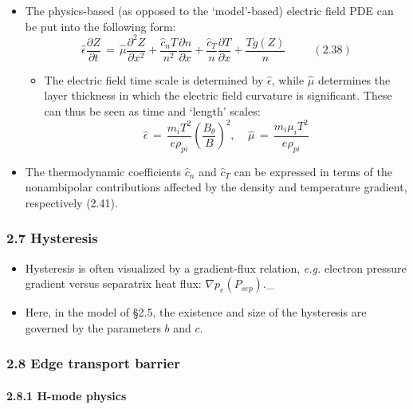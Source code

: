 \documentclass[]{article}
\providecommand{\tightlist}{%
  \setlength{\itemsep}{0pt}\setlength{\parskip}{0pt}}
\let\oldparagraph\paragraph
\renewcommand{\paragraph}[1]{\oldparagraph{#1}\mbox{}}
\begin{document}
\begin{itemize}
\item
  The physics-based (as opposed to the `model'-based) electric field PDE
  can be put into the following form:
  \[\hat{\epsilon} \frac{\partial Z}{\partial t} \,=\, \hat{\mu} \frac{\partial^2 Z}{\partial x^2} + \frac{\hat{c}_n T}{n^2} \frac{\partial n}{\partial x} + \frac{\hat{c}_T}{n} \frac{\partial T}{\partial x} + \frac{T g(Z)}{n} ~~~~~~~~~~~ (2.38)\]

  \begin{itemize}
  \tightlist
  \item
    The electric field time scale is determined by \(\hat{\epsilon}\),
    while \(\hat{\mu}\) determines the layer thickness in which the
    electric field curvature is significant. These can thus be seen as
    time and `length' scales:
    \[\hat{\epsilon} \,=\, \frac{m_i T^2}{e \rho_{pi}} \left(\frac{B_\theta}{B}\right)^2, ~~~~~ \hat{\mu} \,=\, \frac{m_i \mu_i T^2}{e \rho_{pi}}\]
  \end{itemize}
\item
  The thermodynamic coefficients \(\hat{c}_n\) and \(\hat{c}_T\) can be
  expressed in terms of the nonambipolar contributions affected by the
  density and temperature gradient, respectively {(2.41)}.
\end{itemize}

\subsubsection{2.7 Hysteresis}\label{hysteresis}

\begin{itemize}
\item
  Hysteresis is often visualized by a gradient-flux relation,
  \emph{e.g.} electron pressure gradient versus separatrix heat flux:
  \(\nabla p_e(P_{sep})\).\_
\item
  Here, in the model of §2.5, the existence and size of the hysteresis
  are governed by the parameters \(b\) and \(c\).
\end{itemize}

\subsubsection{2.8 Edge transport barrier}\label{edge-transport-barrier}

\paragraph{2.8.1 H-mode physics}\label{h-mode-physics}
\end{document}
